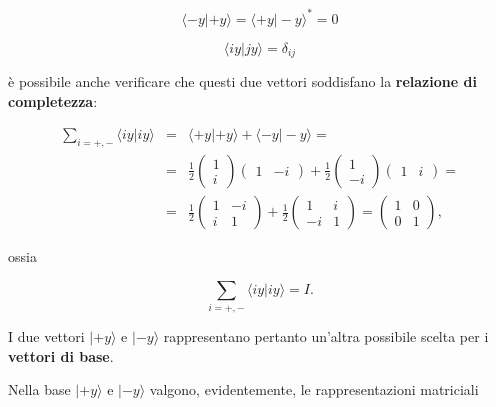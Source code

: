 \documentclass[a4paper,12pt,oneside]{book}
\begin{document}
\begin{equation}
\langle -y | +y \rangle = \langle +y | -y \rangle ^*=0
\end{equation}

\begin{equation}
\langle iy | jy \rangle = \delta_{ij}
\end{equation}

è possibile anche verificare che questi due vettori soddisfano la \textbf{relazione di completezza}:

\begin{eqnarray}
\sum _{i=+,-} \langle iy | iy \rangle &=& \langle +y | +y \rangle + \langle -y | -y \rangle =  \nonumber \\
&=& \frac{1}{2}
\begin{pmatrix}
1\\
i
\end{pmatrix}
\begin{pmatrix}
1 & -i
\end{pmatrix}+
\frac{1}{2}
\begin{pmatrix}
1\\
-i
\end{pmatrix}
\begin{pmatrix}
1 & i
\end{pmatrix}= \nonumber \\
&=& \frac{1}{2}
\begin{pmatrix}
1 & -i\\
i & 1
\end{pmatrix}+
\frac{1}{2}
\begin{pmatrix}
1 & i\\
-i & 1
\end{pmatrix}=
\begin{pmatrix}
1 & 0\\
0 & 1
\end{pmatrix},
\end{eqnarray}

ossia

\begin{equation}
\sum \limits_{i=+,-} \langle iy | iy \rangle =I .
\end{equation}


I due vettori $| +y \rangle $ e $| -y \rangle $ rappresentano pertanto un'altra possibile scelta per i \textbf{vettori di base}.

Nella base $| +y \rangle $ e $| -y \rangle $ valgono, evidentemente, le rappresentazioni matriciali
\end{document}
